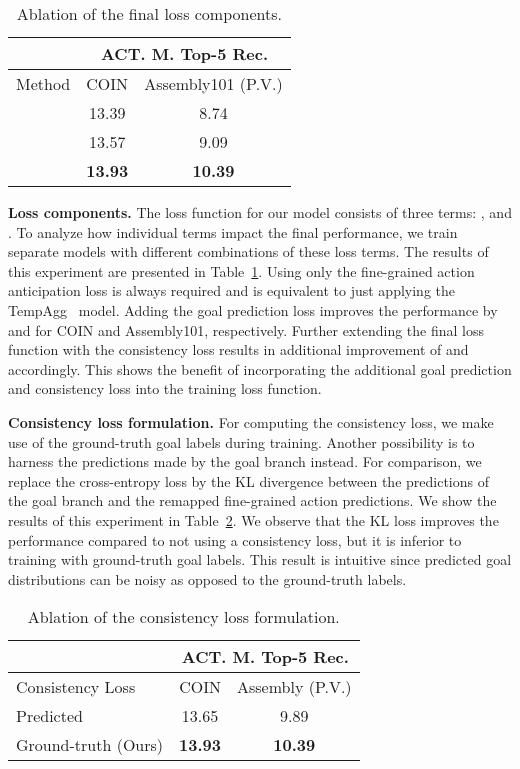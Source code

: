 \documentclass{article}
\begin{document}
\begin{table}[h!]
    \scriptsize
    \centering
    \begin{tabular}{|l|c|c|}
        \hline
         & \multicolumn{2}{c|}{ACT. M. Top-5 Rec.} \\
         \hline
         Method & COIN & Assembly101 (P.V.)\\
         \hline
          & 13.39 & 8.74 \\
          & 13.57 & 9.09 \\
          & \textbf{13.93} & \textbf{10.39} \\
         \hline
    \end{tabular}
    \caption{\small Ablation of the final loss components.}
    \label{tab:abl_components}
\end{table}

\textbf{Loss components.} The loss function for our model consists of three terms: ,  and . To analyze how individual terms impact the final performance, we train separate models with different combinations of these loss terms. The results of this experiment are presented in Table~\ref{tab:abl_components}. Using only the fine-grained action anticipation loss  is always required and is equivalent to just applying the TempAgg~\cite{sener2022assembly101} model. Adding the goal prediction loss improves the performance by  and  for COIN and Assembly101, respectively. Further extending the final loss function with the consistency loss  results in additional improvement of  and  accordingly. This shows the benefit of incorporating the additional goal prediction and consistency loss into the training loss function.


\textbf{Consistency loss formulation.} For computing the consistency loss, we make use of the ground-truth goal labels during training. Another possibility is to harness the predictions made by the goal branch instead. For comparison, we replace the cross-entropy loss by the KL divergence between the predictions of the goal branch and the remapped fine-grained action predictions. 
We show the results of this experiment in Table~\ref{tab:abl_formulation}.  We observe that the KL loss improves the performance compared to not using a consistency loss, but it is inferior to training with ground-truth goal labels. This result is intuitive since predicted goal distributions can be noisy as opposed to the ground-truth labels.
\begin{table}[h!]
    \centering
    \scriptsize
    \begin{tabular}{|l|c|c|}
        \hline
        & \multicolumn{2}{c|}{ACT. M. Top-5 Rec.} \\
        \hline
        Consistency Loss & COIN & Assembly (P.V.)  \\
        \hline
        Predicted & 13.65 & 9.89 \\
        Ground-truth (Ours) & \textbf{13.93} &\textbf{10.39} \\
        \hline
    \end{tabular}
    \caption{\small Ablation of the consistency loss formulation.}
    \label{tab:abl_formulation}
\end{table}
\end{document}
